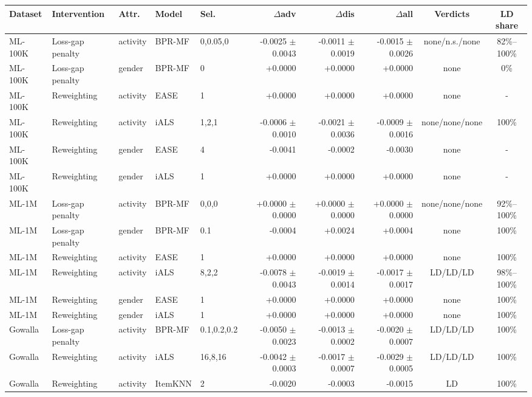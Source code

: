 \begin{tabular}{lllllrrrcc}
\toprule
Dataset & Intervention & Attr. & Model & Sel. & $\Delta$adv & $\Delta$dis & $\Delta$all & Verdicts & LD share \\
\midrule
ML-100K & Loss-gap penalty & activity & BPR-MF & 0,0.05,0 & -0.0025 $\pm$ 0.0043 & -0.0011 $\pm$ 0.0019 & -0.0015 $\pm$ 0.0026 & none/n.s./none & 82\%--100\% \\
ML-100K & Loss-gap penalty & gender & BPR-MF & 0 & +0.0000 & +0.0000 & +0.0000 & none & 0\% \\
ML-100K & Reweighting & activity & EASE & 1 & +0.0000 & +0.0000 & +0.0000 & none & - \\
ML-100K & Reweighting & activity & iALS & 1,2,1 & -0.0006 $\pm$ 0.0010 & -0.0021 $\pm$ 0.0036 & -0.0009 $\pm$ 0.0016 & none/none/none & 100\% \\
ML-100K & Reweighting & gender & EASE & 4 & -0.0041 & -0.0002 & -0.0030 & none & - \\
ML-100K & Reweighting & gender & iALS & 1 & +0.0000 & +0.0000 & +0.0000 & none & - \\
ML-1M & Loss-gap penalty & activity & BPR-MF & 0,0,0 & +0.0000 $\pm$ 0.0000 & +0.0000 $\pm$ 0.0000 & +0.0000 $\pm$ 0.0000 & none/none/none & 92\%--100\% \\
ML-1M & Loss-gap penalty & gender & BPR-MF & 0.1 & -0.0004 & +0.0024 & +0.0004 & none & 100\% \\
ML-1M & Reweighting & activity & EASE & 1 & +0.0000 & +0.0000 & +0.0000 & none & 100\% \\
ML-1M & Reweighting & activity & iALS & 8,2,2 & -0.0078 $\pm$ 0.0043 & -0.0019 $\pm$ 0.0014 & -0.0017 $\pm$ 0.0017 & LD/LD/LD & 98\%--100\% \\
ML-1M & Reweighting & gender & EASE & 1 & +0.0000 & +0.0000 & +0.0000 & none & 100\% \\
ML-1M & Reweighting & gender & iALS & 1 & +0.0000 & +0.0000 & +0.0000 & none & 100\% \\
Gowalla & Loss-gap penalty & activity & BPR-MF & 0.1,0.2,0.2 & -0.0050 $\pm$ 0.0023 & -0.0013 $\pm$ 0.0002 & -0.0020 $\pm$ 0.0007 & LD/LD/LD & 100\% \\
Gowalla & Reweighting & activity & iALS & 16,8,16 & -0.0042 $\pm$ 0.0003 & -0.0017 $\pm$ 0.0007 & -0.0029 $\pm$ 0.0005 & LD/LD/LD & 100\% \\
Gowalla & Reweighting & activity & ItemKNN & 2 & -0.0020 & -0.0003 & -0.0015 & LD & 100\% \\
\bottomrule
\end{tabular}
